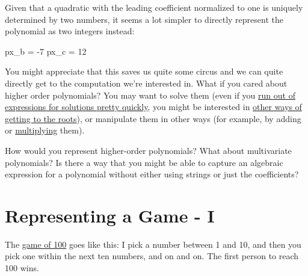 \documentclass[
  letterpaper,
  DIV=11,
  numbers=noendperiod]{scrreprt}
\newenvironment{Shaded}{\begin{snugshade}}{\end{snugshade}}
\newcommand{\DecValTok}[1]{\textcolor[rgb]{0.68,0.00,0.00}{#1}}
\newcommand{\NormalTok}[1]{\textcolor[rgb]{0.00,0.23,0.31}{#1}}
\newcommand{\OperatorTok}[1]{\textcolor[rgb]{0.37,0.37,0.37}{#1}}
\begin{document}
Given that a quadratic with the leading coefficient normalized to one is
uniquely determined by two numbers, it seems a lot simpler to directly
represent the polynomial as two integers instead:

\begin{Shaded}
\begin{Highlighting}[]
\NormalTok{px\_b }\OperatorTok{=} \OperatorTok{{-}}\DecValTok{7}
\NormalTok{px\_c }\OperatorTok{=} \DecValTok{12}
\end{Highlighting}
\end{Shaded}

You might appreciate that this saves us quite some circus and we can
quite directly get to the computation we're interested in. What if you
cared about higher order polynomials? You may want to solve them (even
if you
\href{https://www.youtube.com/watch?t=2543\&v=O5eH3x3sTNA\&feature=youtu.be}{run
out of expressions for solutions pretty quickly}, you might be
interested in \href{https://math.stackexchange.com/a/1386830}{other ways
of getting to the roots}), or manipulate them in other ways (for
example, by adding or
\href{https://www.youtube.com/watch?v=h7apO7q16V0}{multiplying} them).

\begin{tcolorbox}[standard jigsaw,toptitle=1mm, titlerule=0mm, bottomtitle=1mm, title=\textcolor{quarto-callout-caution-color}{\faFire}\hspace{0.5em}{Food for thought.}, coltitle=black, colback=white, toprule=.15mm, colframe=quarto-callout-caution-color-frame, arc=.35mm, rightrule=.15mm, opacityback=0, left=2mm, leftrule=.75mm, colbacktitle=quarto-callout-caution-color!10!white, opacitybacktitle=0.6, bottomrule=.15mm]
How would you represent higher-order polynomials? What about
multivariate polynomials? Is there a way that you might be able to
capture an algebraic expression for a polynomial without either using
strings or just the coefficients?
\end{tcolorbox}

\hypertarget{representing-a-game---i}{%
\section{Representing a Game - I}\label{representing-a-game---i}}

The \href{https://www.youtube.com/watch?v=846A4rgO_os}{game of 100} goes
like this: I pick a number between 1 and 10, and then you pick one
within the next ten numbers, and on and on. The first person to reach
100 wins.
\end{document}
